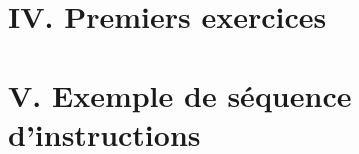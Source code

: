

\usepackage{parcolumns}
\setlength{\parindent}{0pt}

 

\section*{IV. Premiers exercices}


\section*{V. Exemple de séquence d'instructions}


